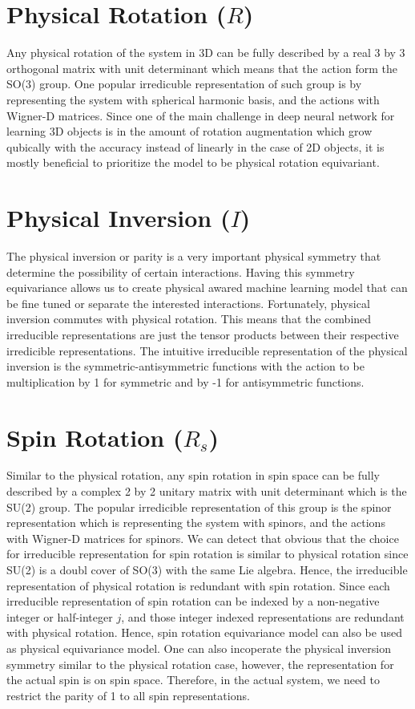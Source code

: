 \documentclass[reprint, 10pt]{revtex4-2}
\begin{document}
\section{Physical Rotation ($R$)}
Any physical rotation of the system in 3D can be fully described by a real 3 by 3 orthogonal matrix with unit determinant
which means that the action form the SO(3) group. One popular irredicuble representation of such group is by representing
the system with spherical harmonic basis, and the actions with Wigner-D matrices. Since one of the main challenge in 
deep neural network for learning 3D objects is in the amount of rotation augmentation which grow qubically with the 
accuracy instead of linearly in the case of 2D objects, it is mostly beneficial to prioritize the model to be physical
rotation equivariant.

\section{Physical Inversion ($I$)}
The physical inversion or parity is a very important physical symmetry that determine the possibility of certain interactions.
Having this symmetry equivariance allows us to create physical awared machine learning model that can be fine tuned or separate
the interested interactions. Fortunately, physical inversion commutes with physical rotation. This means that the combined
irreducible representations are just the tensor products between their respective irredicible representations. The intuitive
irreducible representation of the physical inversion is the symmetric-antisymmetric functions with the action to be multiplication
by 1 for symmetric and by -1 for antisymmetric functions.

\section{Spin Rotation ($R_s$)}
Similar to the physical rotation, any spin rotation in spin space can be fully described by a complex 2 by 2 unitary matrix
with unit determinant which is the SU(2) group. The popular irredicible representation of this group is the spinor representation
which is representing the system with spinors, and the actions with Wigner-D matrices for spinors. We can detect that obvious
that the choice for irreducible representation for spin rotation is similar to physical rotation since SU(2) is a doubl cover
of SO(3) with the same Lie algebra. Hence, the irreducible representation of physical rotation is redundant with spin rotation.
Since each irreducible representation of spin rotation can be indexed by a non-negative integer or half-integer $j$, 
and those integer indexed representations are redundant with physical rotation. Hence, spin rotation equivariance model can
also be used as physical equivariance model. One can also incoperate the physical inversion symmetry similar to the physical rotation case, 
however, the representation for the actual spin is on spin space. Therefore, in the actual system, we need to restrict
the parity of 1 to all spin representations.
\end{document}

